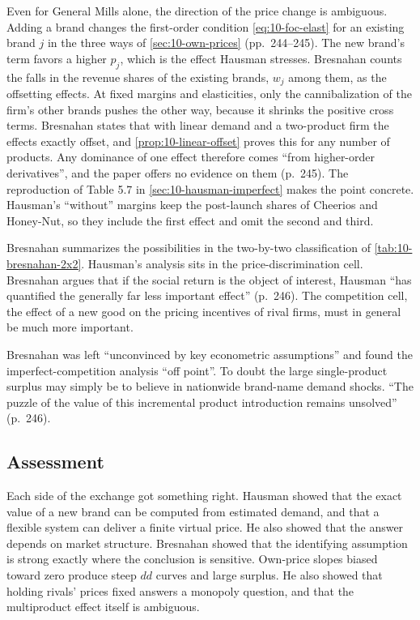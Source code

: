 Even for General Mills alone, the direction of the price change is ambiguous. Adding a brand changes the
first-order condition \eqref{eq:10-foc-elast} for an existing brand $j$ in the three ways of
\cref{sec:10-own-prices} (pp.~244--245). The new brand's term favors a higher $p_j$, which is the effect
Hausman stresses. Bresnahan counts the falls in the revenue shares of the existing brands, $w_j$ among them,
as the offsetting effects. At fixed margins and elasticities, only the cannibalization of the firm's other
brands pushes the other way, because it shrinks the positive cross terms. Bresnahan states that with linear demand and a two-product firm the effects exactly offset, and
\cref{prop:10-linear-offset} proves this for any number of products. Any dominance of one effect therefore
comes ``from higher-order derivatives'', and the paper offers no evidence on them (p.~245). The reproduction of Table 5.7 in
\cref{sec:10-hausman-imperfect} makes the point concrete. Hausman's ``without'' margins keep the post-launch
shares of Cheerios and Honey-Nut, so they include the first effect and omit the second and third.

Bresnahan summarizes the possibilities in the two-by-two classification of \cref{tab:10-bresnahan-2x2}.
Hausman's analysis sits in the price-discrimination cell. Bresnahan argues that if the social return is the object of interest, Hausman ``has
quantified the generally far less important effect'' (p.~246). The competition cell, the effect of a new
good on the pricing incentives of rival firms, must in general be much more important.

Bresnahan was left ``unconvinced by key econometric assumptions'' and found the imperfect-competition
analysis ``off point''. To doubt the large single-product surplus may simply be to believe in nationwide
brand-name demand shocks. ``The puzzle of the value of this incremental product introduction remains
unsolved'' (p.~246).

\subsection{Assessment}\label{sec:10-bresnahan-assessment}

Each side of the exchange got something right. Hausman showed that the exact value of a new brand can be
computed from estimated demand, and that a flexible system can deliver a finite virtual price. He also showed
that the answer depends on market structure. Bresnahan showed that the identifying assumption is strong
exactly where the conclusion is sensitive. Own-price slopes biased toward zero produce steep $dd$ curves and
large surplus. He also showed that holding rivals' prices fixed answers a monopoly question, and that the
multiproduct effect itself is ambiguous.


